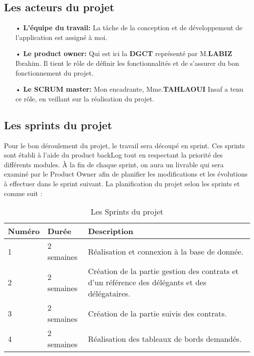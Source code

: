\subsection{Les acteurs du projet}
\begin{itemize}
    \item[•] \textbf{L’équipe du travail:} La tâche de la conception et de développement de l’application est assigné à moi.
    \item[•] \textbf{Le product owner:} Qui est ici la \textbf{DGCT} représenté par M.\textbf{LABIZ} Ibrahim. Il tient le rôle de définir les fonctionnalités et de s’assurer du bon fonctionnement du projet.
    \item[•] \textbf{Le SCRUM master:} Mon encadrante, Mme.\textbf{TAHLAOUI} Insaf a tenu ce rôle, en veillant sur la réalisation du projet.
\end{itemize}
\subsection{Les sprints du projet}
Pour le bon déroulement du projet, le travail sera découpé en sprint. Ces sprints sont établi à l’aide du product backLog tout en respectant la priorité des différents modules. À la fin de chaque sprint, on aura un livrable qui sera examiné par le Product Owner afin de planifier les modifications et les évolutions à effectuer dans le sprint suivant. La planification du projet selon les sprints et comme suit :
\begin{table}[H]
    \begin{center}
        \begin{tabularx}{17.5cm}{|p{2cm}|p{2cm}|X|}
            \hline
            \textbf{Numéro} & \textbf{Durée} & \textbf{Description}                                                                            \\
            \hline
            1               & 2 semaines     & Réalisation et connexion à la base de donnée.                                                   \\
            \hline
            2               & 2 semaines     & Création de la partie gestion des contrats et d'un référence des délégants et des délégataires. \\
            \hline
            3               & 2 semaines     & Création de la partie suivis des contrats.                                                      \\
            \hline
            4               & 2 semaines     & Réalisation des tableaux de bords demandés.                                                     \\
            \hline
        \end{tabularx}
        \caption{Les Sprints du projet}
    \end{center}
\end{table}
